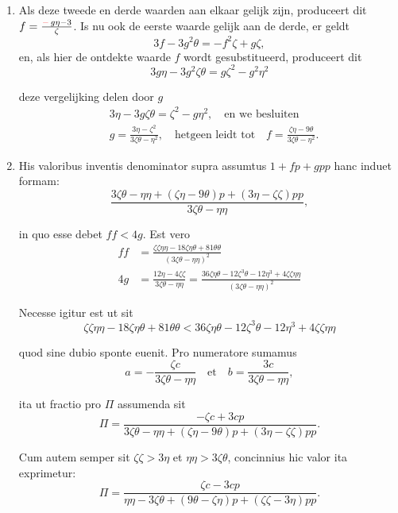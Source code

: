 \documentclass[10pt,a4paper]{article}
\newcommand{\switchenum}{\setcounter{enumi}{\arabic{enumi}-1}\switchcolumn}
\begin{document}
\begin{paracol}{2}
\begin{enumerate}[topsep=1px]
		\switchenum
		\item Als deze tweede en derde waarden aan elkaar gelijk zijn, produceert dit $f=\frac{{\color{red}-}\, g\eta -3}{\zeta}$. Is nu ook de eerste waarde gelijk aan de derde, er geldt
		\[
			3f-3g^2\theta = -f^2 \zeta + g \zeta,
		\]
		en, als hier de ontdekte waarde $f$ wordt gesubstitueerd, produceert dit
		\[
			3g\eta -3g^2\zeta \theta = g\zeta^2 - g^2\eta^2
		\]
		\par deze vergelijking delen door $g$ 
		\begin{align*}
			&3\eta - 3g\zeta \theta = \zeta^2 - g\eta^2, \quad \text{en we besluiten}\\
			&g= \frac{3\eta - \zeta^2}{3\zeta \theta - \eta^2}, \quad \text{hetgeen leidt tot} \quad f = \frac{\zeta \eta - 9\theta}{3\zeta \theta - \eta^2}.
		\end{align*}

		\switchcolumn*
		
		\item His valoribus inventis denominator supra assumtus $1+fp+gpp$ hanc induet formam:
		\[
			\frac{3\zeta \theta - \eta \eta + (\zeta \eta - 9\theta)p + (3\eta -\zeta \zeta)pp}{3\zeta \theta - \eta \eta},
		\]
		\par in quo esse debet $ff< 4g$. Est vero
		\begin{align*}
			ff &= \frac{\zeta \zeta \eta \eta -18\zeta \eta \theta + 81 \theta \theta}{(3\zeta \theta - \eta \eta)^2}\\
			4g &= \frac{12\eta - 4\zeta \zeta }{3\zeta \theta-\eta \eta} = \frac{36\zeta \eta \theta - 12 \zeta ^3\theta - 12 \eta^3+4\zeta \zeta \eta \eta}{(3\zeta \theta - \eta \eta)^2}
		\end{align*}
		\par Necesse igitur est ut sit
		\[
			\zeta \zeta \eta \eta -18 \zeta \eta \theta +81 \theta \theta < 36 \zeta \eta \theta - 12 \zeta^3\theta -12\eta^3 + 4 \zeta \zeta \eta \eta
		\]
		\par quod sine dubio sponte euenit. Pro numeratore sumamus
		\[
			a = - \frac{\zeta c}{3\zeta \theta - \eta \eta} \quad \text{et}\quad b = \frac{3c}{3\zeta \theta - \eta \eta},
		\]
		\par ita ut fractio pro $\Pi$ assumenda sit
		\[
			\Pi = \frac{-\zeta c + 3cp}{3\zeta \theta -\eta \eta +(\zeta \eta - 9\theta)p+(3\eta - \zeta \zeta)pp}.
		\]
		\par Cum autem semper sit $\zeta \zeta > 3\eta$ et $\eta \eta > 3\zeta \theta$, concinnius hic valor ita exprimetur:
		\[
			\Pi = \frac{\zeta c - 3cp }{\eta \eta - 3\zeta \theta +(9\theta - \zeta \eta)p + (\zeta \zeta - 3\eta)pp}.
		\]
		

\end{enumerate}
\end{paracol}
\end{document}
